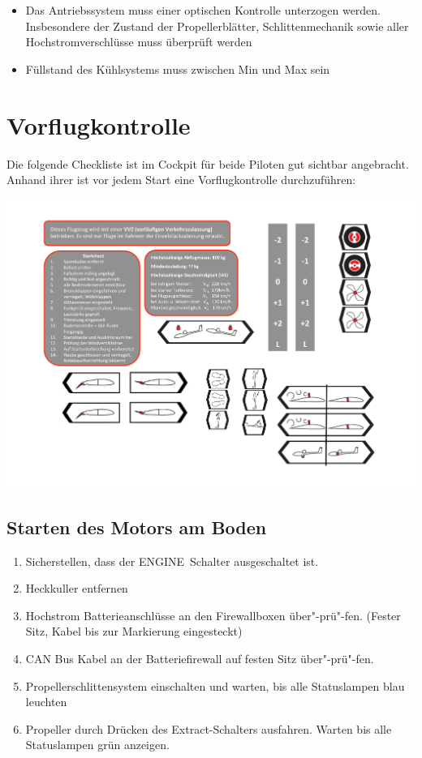 \begin{itemize}
\item Das Antriebssystem muss einer optischen Kontrolle unterzogen werden. Insbesondere der Zustand der Propellerblätter, Schlittenmechanik sowie aller Hochstromverschlüsse muss überprüft werden
\item  Füllstand des Kühlsystems muss zwischen Min und Max sein
\end{itemize}

\section{Vorflugkontrolle}
Die folgende Checkliste ist im Cockpit für beide Piloten gut sichtbar angebracht. Anhand ihrer ist vor jedem Start eine Vorflugkontrolle durchzuführen:
\begin{center}
\includegraphics[width=.45\textwidth]{bilder/startcheck.pdf}
\end{center}

\subsection{Starten des Motors am Boden}

\begin{enumerate}
\item Sicherstellen, dass der \glqq ENGINE\grqq\ Schalter ausgeschaltet ist.
\item Heckkuller entfernen
\item Hochstrom Batterieanschlüsse an den Firewallboxen über"-prü"-fen. (Fester Sitz, Kabel bis zur Markierung eingesteckt)
\item CAN Bus Kabel an der Batteriefirewall auf festen Sitz über"-prü"-fen.
\item Propellerschlittensystem einschalten und warten, bis alle Statuslampen blau leuchten
\item Propeller durch Drücken des \glqq Extract\grqq-Schalters ausfahren. Warten bis alle Statuslampen grün anzeigen.
\end{enumerate}

